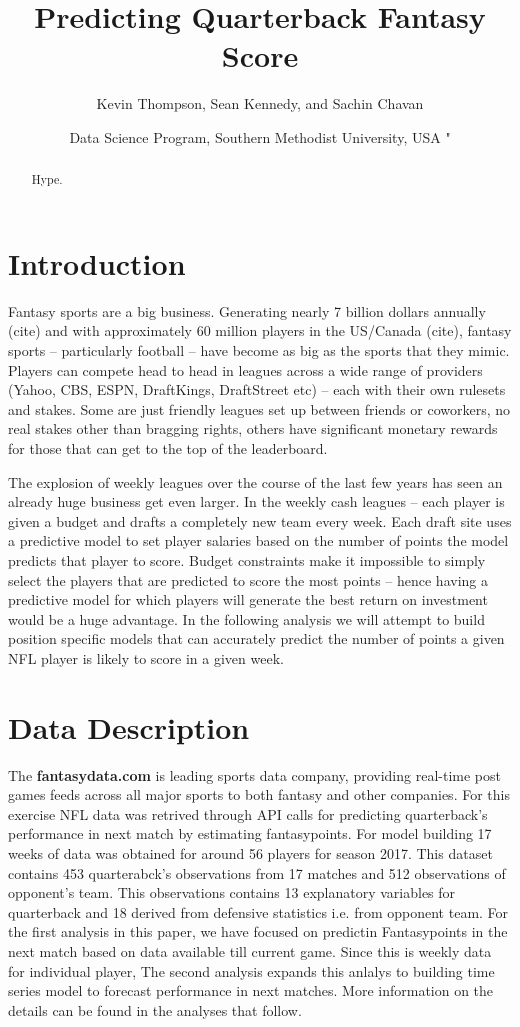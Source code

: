 \documentclass[american,]{article}
\title{Predicting Quarterback Fantasy Score}
\author{Kevin Thompson, Sean Kennedy, and Sachin Chavan}
\date{Data Science Program, Southern Methodist University, USA \break"}
\begin{document}
\maketitle
\begin{abstract}
Hype.
\end{abstract}

\section{Introduction}\label{introduction}

Fantasy sports are a big business. Generating nearly 7 billion dollars
annually (cite) and with approximately 60 million players in the
US/Canada (cite), fantasy sports -- particularly football -- have become
as big as the sports that they mimic. Players can compete head to head
in leagues across a wide range of providers (Yahoo, CBS, ESPN,
DraftKings, DraftStreet etc) -- each with their own rulesets and stakes.
Some are just friendly leagues set up between friends or coworkers, no
real stakes other than bragging rights, others have significant monetary
rewards for those that can get to the top of the leaderboard.

The explosion of weekly leagues over the course of the last few years
has seen an already huge business get even larger. In the weekly cash
leagues -- each player is given a budget and drafts a completely new
team every week. Each draft site uses a predictive model to set player
salaries based on the number of points the model predicts that player to
score. Budget constraints make it impossible to simply select the
players that are predicted to score the most points -- hence having a
predictive model for which players will generate the best return on
investment would be a huge advantage. In the following analysis we will
attempt to build position specific models that can accurately predict
the number of points a given NFL player is likely to score in a given
week.

\section{Data Description}\label{data-description}

The \textbf{fantasydata.com} is leading sports data company, providing real-time post games feeds across all major sports to both fantasy and other companies. For this exercise NFL data was retrived through API calls for predicting quarterback's performance in next match by estimating fantasypoints. For model building 17 weeks of data was obtained for around 56 players for season 2017. This dataset contains 453 quarterabck's observations from 17 matches and 512 observations of opponent's team. This observations contains 13 explanatory variables for quarterback and 18 derived from defensive statistics i.e. from opponent team. For the first analysis in this paper, we have focused on predictin Fantasypoints in the next match based on data available till current game. Since this is weekly data for individual player, The second analysis expands this anlalys to building time series model to forecast performance in next matches. More information on the details can be found in the analyses that follow. 
\end{document}
